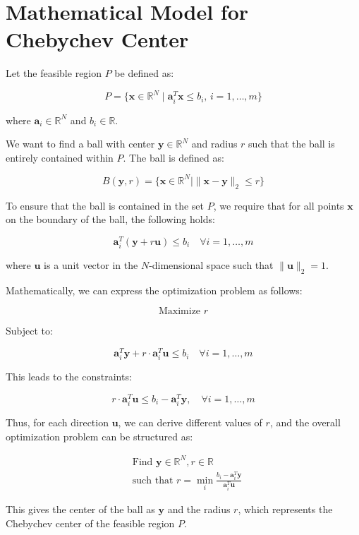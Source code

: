 \documentclass{article}
\begin{document}
\section*{Mathematical Model for Chebychev Center}

Let the feasible region \( P \) be defined as:

\[
P = \{ \mathbf{x} \in \mathbb{R}^N \mid \mathbf{a}_i^T \mathbf{x} \leq b_i, \, i = 1, \ldots, m \}
\]

where \( \mathbf{a}_i \in \mathbb{R}^N \) and \( b_i \in \mathbb{R} \). 

We want to find a ball with center \( \mathbf{y} \in \mathbb{R}^N \) and radius \( r \) such that the ball is entirely contained within \( P \). The ball is defined as:

\[
B(\mathbf{y}, r) = \{ \mathbf{x} \in \mathbb{R}^N \mid \|\mathbf{x} - \mathbf{y}\|_2 \leq r \}
\]

To ensure that the ball is contained in the set \( P \), we require that for all points \( \mathbf{x} \) on the boundary of the ball, the following holds:

\[
\mathbf{a}_i^T (\mathbf{y} + r \mathbf{u}) \leq b_i \quad \forall i = 1, \ldots, m
\]

where \( \mathbf{u} \) is a unit vector in the \( N \)-dimensional space such that \( \|\mathbf{u}\|_2 = 1 \).

Mathematically, we can express the optimization problem as follows:

\[
\text{Maximize } r
\]

Subject to:

\[
\mathbf{a}_i^T \mathbf{y} + r \cdot \mathbf{a}_i^T \mathbf{u} \leq b_i \quad \forall i = 1, \ldots, m
\]

This leads to the constraints:

\[
r \cdot \mathbf{a}_i^T \mathbf{u} \leq b_i - \mathbf{a}_i^T \mathbf{y}, \quad \forall i = 1, \ldots, m
\]

Thus, for each direction \( \mathbf{u} \), we can derive different values of \( r \), and the overall optimization problem can be structured as:

\[
\begin{aligned}
& \text{Find } \mathbf{y} \in \mathbb{R}^N, r \in \mathbb{R} \\
& \text{such that } r = \min_{i} \frac{b_i - \mathbf{a}_i^T \mathbf{y}}{\mathbf{a}_i^T \mathbf{u}}
\end{aligned}
\]

This gives the center of the ball as \( \mathbf{y} \) and the radius \( r \), which represents the Chebychev center of the feasible region \( P \).
\end{document}
